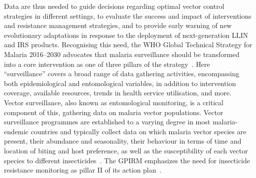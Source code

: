 \begin{refsection}
Data are thus needed to guide decisions regarding optimal vector control strategies in different settings, to evaluate the success and impact of interventions and resistance management strategies, and to provide early warning of new evolutionary adaptations in response to the deployment of next-generation LLIN and IRS products.
%
Recognising this need, the WHO Global Technical Strategy for Malaria 2016--2030 advocates that malaria surveillance should be transformed into a core intervention as one of three pillars of the strategy~\parencite{WHO2015GTS}.
%
Here ``surveillance'' covers a broad range of data gathering activities, encompassing both epidemiological and entomological variables, in addition to intervention coverage, available resources, trends in health service utilisation, and more. 
%
Vector surveillance, also known as entomological monitoring, is a critical component of this, gathering data on malaria vector populations.
%
Vector surveillance programmes are established to a varying degree in most malaria-endemic countries and typically collect data on which malaria vector species are present, their abundance and seasonality, their behaviour in terms of time and location of biting and host preference, as well as the susceptibility of each vector species to different insecticides~\parencite{Russell2020}.
%
The GPIRM emphasizes the need for insecticide resistance monitoring as pillar \RN{2} of its action plan~\parencite{WHO2012GPIRM}.



\end{refsection}
